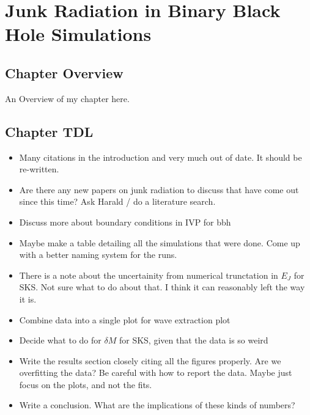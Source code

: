\chapter{Junk Radiation in Binary Black Hole Simulations}

\section{Chapter Overview}

An Overview of my chapter here.


\section{Chapter TDL}
\begin{itemize}

\item Many citations in the introduction and very much out of
  date. It should be re-written.

\item Are there any new papers on junk radiation to discuss that have
  come out since this time? Ask Harald / do a literature search.

\item Discuss more about boundary conditions in IVP for bbh

\item Maybe make a table detailing all the simulations that were
  done. Come up with a better naming system for the runs.

\item There is a note about the uncertainity from numerical
  trunctation in $E_J$ for SKS. Not sure what to do about that. I
  think it can reasonably left the way it is.

\item Combine data into a single plot for wave extraction plot

\item Decide what to do for $\delta M$ for SKS, given that the data is
  so weird

\item Write the results section closely citing all the figures
  properly. Are we overfitting the data? Be careful with how to report
  the data. Maybe just focus on the plots, and not the fits.

\item Write a conclusion. What are the implications of these kinds of
  numbers?

\end{itemize}


